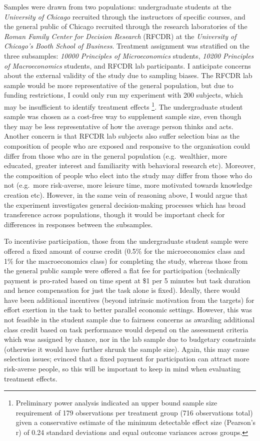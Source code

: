 \documentclass[12pt, letterpaper, DIV=11, numbers=noendperiod]{article}
\begin{document}
Samples were drawn from two populations: undergraduate students at the \emph{University of Chicago} recruited through the instructors of specific courses, and the general public of Chicago recruited through the research laboratories of the \emph{Roman Family Center for Decision Research} (RFCDR) at the \emph{University of Chicago's Booth School of Business}. Treatment assignment was stratified on the three subsamples: \emph{10000 Principles of Microeconomics} students, \emph{10200 Principles of Macroeconomics} students, and RFCDR lab participants. I anticipate concerns about the external validity of the study due to sampling biases. The RFCDR lab sample would be more representative of the general population, but due to funding restrictions, I could only run my experiment with 200 subjects, which may be insufficient to identify treatment effects \footnote{Preliminary power analysis indicated an upper bound sample size requirement of 179 observations per treatment group (716 observations total) given a conservative estimate of the minimum detectable effect size (Pearson's r) of 0.24 standard deviations and equal outcome variances across groups.}. The undergraduate student sample was chosen as a cost-free way to supplement sample size, even though they may be less representative of how the average person thinks and acts. Another concern is that RFCDR lab subjects also suffer selection bias as the composition of people who are exposed and responsive to the organisation could differ from those who are in the general population (e.g.~wealthier, more educated, greater interest and familiarity with behavioral research etc). Moreover, the composition of people who elect into the study may differ from those who do not (e.g.~more risk-averse, more leisure time, more motivated towards knowledge creation etc). However, in the same vein of reasoning above, I would argue that the experiment investigates general decision-making processes which has broad transference across populations, though it would be important check for differences in responses between the subsamples.

To incentivise participation, those from the undergraduate student sample were offered a fixed amount of course credit (0.5\% for the microeconomics class and 1\% for the macroeconomics class) for completing the study, whereas those from the general public sample were offered a flat fee for participation (technically payment is pro-rated based on time spent at \$1 per 5 minutes but task duration and hence compensation for just the task alone is fixed). Ideally, there would have been additional incentives (beyond intrinsic motivation from the targets) for effort exertion in the task to better parallel economic settings. However, this was not feasible in the student sample due to fairness concerns as awarding additional class credit based on task performance would depend on the assessment criteria which was assigned by chance, nor in the lab sample due to budgetary constraints (otherwise it would have further shrunk the sample size). Again, this may cause selection issues; \textcite{harrison.2009.riskattitudes} evinced that a fixed payment for participation can attract more risk-averse people, so this will be important to keep in mind when evaluating treatment effects.
\end{document}
